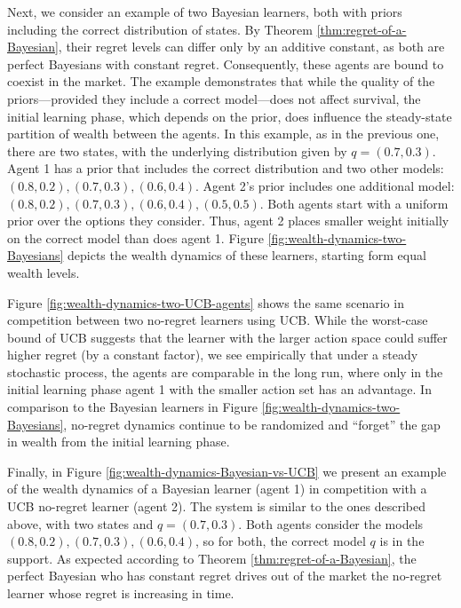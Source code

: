  Next, we consider an example of two Bayesian learners, both with priors including the correct distribution of states. By Theorem \ref{thm:regret-of-a-Bayesian}, their regret levels can differ only by an additive constant, as both are perfect Bayesians with constant regret. Consequently, these agents are bound to coexist in the market. The example demonstrates that while the quality of the priors---provided they include a correct model---does not affect survival, the initial learning phase, which depends on the prior, does influence the steady-state partition of wealth between the agents.  
In this example, as in the previous one, there are two states, with the underlying distribution given by $q = (0.7, 0.3)$. Agent 1 has a prior that includes the correct distribution and two other models: $(0.8,0.2), (0.7,0.3), (0.6,0.4)$. Agent 2's prior includes one additional model: $(0.8,0.2), (0.7,0.3), (0.6,0.4), (0.5, 0.5)$. Both agents start with a uniform prior over the options they consider. Thus, agent 2 places smaller weight initially on the correct model than does agent 1. Figure \ref{fig:wealth-dynamics-two-Bayesians} depicts the wealth dynamics of these learners, starting form equal wealth levels. 

Figure \ref{fig:wealth-dynamics-two-UCB-agents} shows the same scenario in competition between two no-regret learners using UCB. While the worst-case bound of UCB suggests that the learner with the larger action space could suffer higher regret (by a constant factor), we see empirically that under a steady stochastic process, the agents are comparable in the long run, where only in the initial learning phase agent 1 with the smaller action set has an advantage. In comparison to the Bayesian learners in Figure \ref{fig:wealth-dynamics-two-Bayesians}, no-regret dynamics continue to be randomized and ``forget'' the gap in wealth from the initial learning phase. 

 Finally, in Figure \ref{fig:wealth-dynamics-Bayesian-vs-UCB} we present an example of the wealth dynamics of a Bayesian learner (agent 1) in competition with a UCB no-regret learner (agent 2). The system is similar to the ones described above, with two states and $q = (0.7,0.3)$. Both agents consider the models $(0.8,0.2), (0.7,0.3), (0.6,0.4)$, so for both,  the correct model $q$ is in the support. As expected according to Theorem \ref{thm:regret-of-a-Bayesian}, the perfect Bayesian who has constant regret drives out of the market the no-regret learner whose regret is increasing in time.


